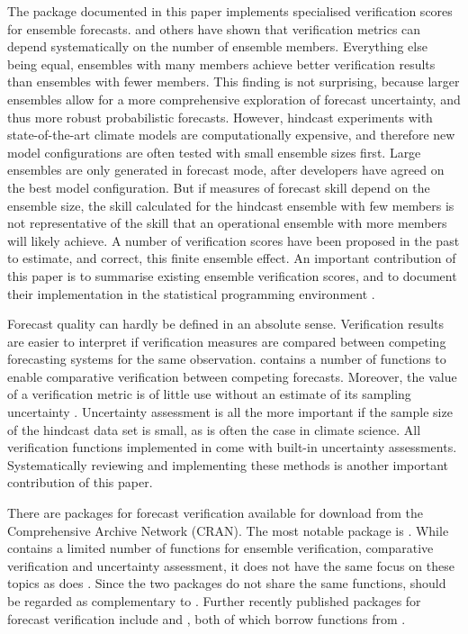 \documentclass[article]{jss}\usepackage{graphicx, color}
\begin{document}
The  package  documented in this paper implements specialised verification scores for ensemble forecasts.
\citet{buizza1998impact} and others have shown that verification metrics can depend systematically on the number of ensemble members. 
Everything else being equal, ensembles with many members achieve better verification results than ensembles with fewer members.
This finding is not surprising, because larger ensembles allow for a more comprehensive exploration of forecast uncertainty, and thus more robust probabilistic forecasts.
However, hindcast experiments with state-of-the-art climate models are computationally expensive, and therefore new model configurations are often tested with small ensemble sizes first.
Large ensembles are only generated in forecast mode, after developers have agreed on the best model configuration.
But if measures of forecast skill depend on the ensemble size, the skill calculated for the hindcast ensemble with few members is not representative of the skill that an operational ensemble with more members will likely achieve.
A number of verification scores have been proposed in the past to estimate, and correct, this finite ensemble effect.
An important contribution of this paper is to summarise existing ensemble verification scores, and to document their implementation in the  statistical programming environment \citep{R2015}.


Forecast quality can hardly be defined in an absolute sense.
Verification results are easier to interpret if verification measures are compared between competing forecasting systems for the same observation.
 contains a number of functions to enable comparative verification between competing forecasts.
Moreover, the value of a verification metric is of little use without an estimate of its sampling uncertainty \citep{jolliffe2007uncertainty}.
Uncertainty assessment is all the more important if the sample size of the hindcast data set is small, as is often the case in climate science.
All verification functions implemented in  come with built-in uncertainty assessments.
Systematically reviewing and implementing these methods is another important contribution of this paper.


There are packages for forecast verification available for download from the Comprehensive  Archive Network (CRAN).
The most notable package is  \citep{cran_verification}. 
While  contains a limited number of functions for ensemble verification, comparative verification and uncertainty assessment, it does not have the same focus on these topics as does .
Since the two packages do not share the same functions,  should be regarded as complementary to .
Further recently published  packages for forecast verification include  \citep{cran_easyverification} and  \citep{cran_s2dverification}, both of which borrow functions from .
\end{document}
